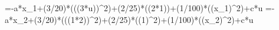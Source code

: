 =-a*x_1+(3/20)*\sin(((3*u))^2)+(2/25)*\cos((2*1))+(1/100)*((x_1)^2)+c*u
=-a*x_2+(3/20)*\sin(((1*2))^2)+(2/25)*\cos((1)^2)+(1/100)*((x_2)^2)+c*u
